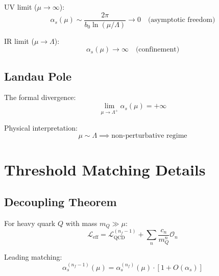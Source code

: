 \documentclass[11pt,a4paper]{article}
\theoremstyle{definition}
\begin{document}
UV limit ($\mu \to \infty$):
\begin{equation}
\label{eq:app-uv-limit}
\alpha_s(\mu) \sim \frac{2\pi}{b_0\ln(\mu/\Lambda)}
  \to 0 \quad \text{(asymptotic freedom)}
\end{equation}

IR limit ($\mu \to \Lambda$):
\begin{equation}
\label{eq:app-ir-limit}
\alpha_s(\mu) \to \infty \quad \text{(confinement)}
\end{equation}

\subsection{Landau Pole}
\label{subsec:landau}

The formal divergence:
\begin{equation}
\label{eq:app-landau}
\lim_{\mu \to \Lambda^+} \alpha_s(\mu) = +\infty
\end{equation}

Physical interpretation:
\begin{equation}
\label{eq:app-landau-phys}
\mu \sim \Lambda \implies \text{non-perturbative regime}
\end{equation}

\section{Threshold Matching Details}
\label{app:threshold-details}

\subsection{Decoupling Theorem}
\label{subsec:decoupling}

For heavy quark $Q$ with mass $m_Q \gg \mu$:
\begin{equation}
\label{eq:app-decoupling}
\mathcal{L}_{\text{eff}} = \mathcal{L}_{\text{QCD}}^{(n_f-1)}
  + \sum_n \frac{c_n}{m_Q^n} \mathcal{O}_n
\end{equation}

Leading matching:
\begin{equation}
\label{eq:app-matching-lead}
\alpha_s^{(n_f-1)}(\mu) = \alpha_s^{(n_f)}(\mu) \cdot \left[1 + O(\alpha_s)\right]
\end{equation}
\end{document}
